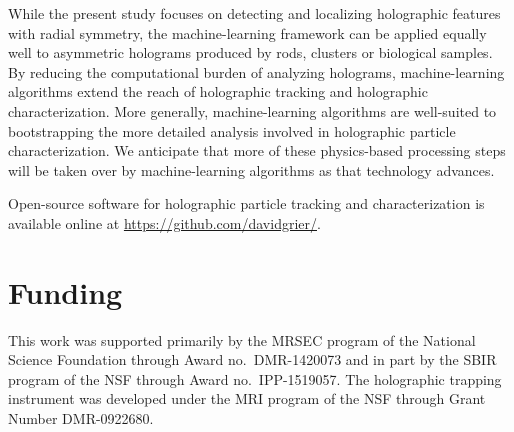 \documentclass[10pt,letterpaper]{article}
\begin{document}
While the present study focuses on detecting and localizing
holographic features with radial symmetry,
the machine-learning framework can be applied equally well to
asymmetric holograms produced by rods, clusters
or biological samples.
By reducing the computational burden of analyzing holograms,
machine-learning algorithms extend the reach of holographic
tracking and holographic characterization.
More generally, machine-learning algorithms are well-suited to bootstrapping
the more detailed analysis involved in holographic particle
characterization.
We anticipate that more of these physics-based
processing steps will be taken over by machine-learning algorithms
as that technology advances.

Open-source software for holographic particle tracking and characterization
is available online at \url{https://github.com/davidgrier/}.

\section*{Funding}

This work was supported primarily by the MRSEC program of the
National Science Foundation through Award no.\ DMR-1420073
and in part by the SBIR program of the NSF through Award no.\
IPP-1519057.
The holographic trapping instrument was developed under the
MRI program of the NSF through Grant Number DMR-0922680.
\end{document}
